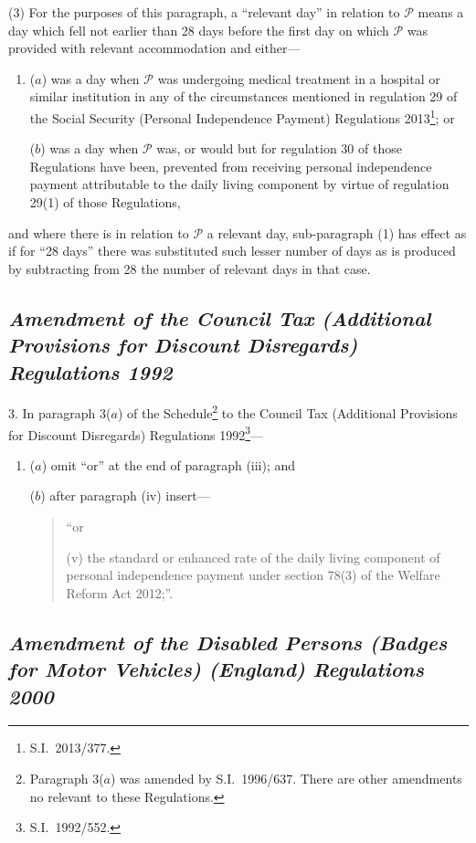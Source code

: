 \documentclass[12pt,a4paper]{article}
\begin{document}
(3) For the purposes of this paragraph, a “relevant day” in relation to $\mathcal{P}$ means a day which fell not earlier than 28 days before the first day on which $\mathcal{P}$ was provided with relevant accommodation and either—
\begin{enumerate}\item[]
($a$) was a day when $\mathcal{P}$ was undergoing medical treatment in a hospital or similar institution in any of the circumstances mentioned in regulation 29 of the Social Security (Personal Independence Payment) Regulations 2013\footnote{S.I.~2013/377.}; or

($b$) was a day when $\mathcal{P}$ was, or would but for regulation 30 of those Regulations have been, prevented from receiving personal independence payment attributable to the daily living component by virtue of regulation 29(1) of those Regulations,
\end{enumerate}
and where there is in relation to $\mathcal{P}$ a relevant day, sub-paragraph (1) has effect as if for “28 days” there was substituted such lesser number of days as is produced by subtracting from 28 the number of relevant days in that case.

\subsection*{\itshape Amendment of the Council Tax (Additional Provisions for Discount Disregards) Regulations 1992}

3.  In paragraph 3($a$)  of the Schedule\footnote{Paragraph 3($a$)  was amended by S.I.~1996/637. There are other amendments no relevant to these Regulations.} to the Council Tax (Additional Provisions for Discount Disregards) Regulations 1992\footnote{S.I.~1992/552.}—
\begin{enumerate}\item[]
($a$) omit “or” at the end of paragraph (iii); and

($b$) after paragraph (iv)  insert—
\begin{quotation}
“or

(v) the standard or enhanced rate of the daily living component of personal independence payment under section 78(3) of the Welfare Reform Act 2012;”.
\end{quotation}
\end{enumerate}

\subsection*{\itshape Amendment of the Disabled Persons (Badges for Motor Vehicles) (England) Regulations 2000}
\end{document}
